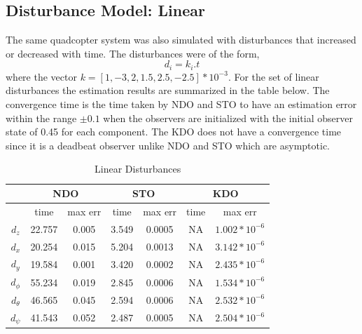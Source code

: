 \documentclass[letterpaper%
, twoside%
, 12pt%
,memoire%
, english%
,creativecommons,hyperref%
]{thETS}
\begin{document}
\subsection{Disturbance Model: Linear}
The same quadcopter system was also simulated with disturbances that increased or decreased with time. The disturbances were of the form, 
\begin{equation}
d_i = k_i.t
\label{eq:dist_3}
\end{equation}
where the vector $k=[1,-3,2,1.5,2.5,-2.5]*10^{-3}$. 
For the set of linear disturbances the estimation results are summarized in the table below. The convergence time is the time taken by NDO and STO to have an estimation error within the range $\pm0.1$ when the observers are initialized with the initial observer state of 0.45 for each component. The KDO does not have a convergence time since it is a deadbeat observer unlike NDO and STO which are asymptotic.
\begin{table}[!htbp]
\centering
\caption{Linear Disturbances}
\begin{tabular}{|c|c|c|c|c|c|c|}
\hline
{}  &  \multicolumn{2}{c|}{NDO} & \multicolumn{2}{c|}{STO} & \multicolumn{2}{c|}{KDO}\\
\hline
{}        &   time   & max err  & time  & max err& time  & max err\\
$d_z$     &  22.757 & 0.005   & 3.549  & 0.0005 & NA     & $1.002*10^{-6}$\\
$d_x$     &  20.254 & 0.015   & 5.204  & 0.0013 & NA     & $3.142*10^{-6}$\\
$d_y$     &  19.584 & 0.001   & 3.420  & 0.0002 & NA     & $2.435*10^{-6}$\\
$d_\phi$  &  55.234 & 0.019   & 2.845  & 0.0006 & NA     & $1.534*10^{-6}$\\
$d_\theta$&  46.565 & 0.045   & 2.594  & 0.0006 & NA     & $2.532*10^{-6}$\\
$d_\psi$  &  41.543 & 0.052   & 2.487  & 0.0005 & NA     & $2.504*10^{-6}$\\
\hline
\end{tabular}
\end{table}
\end{document}

